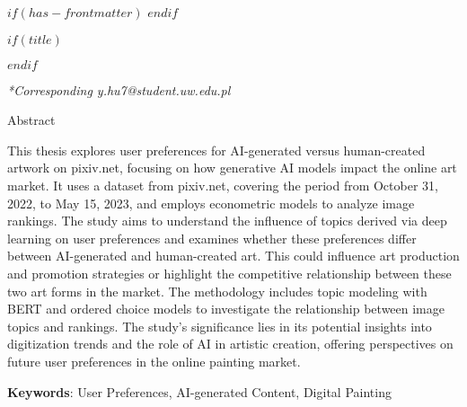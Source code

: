 $if(has-frontmatter)$
\frontmatter
$endif$

$if(title)$
\maketitle
$endif$

\vspace{-1.5 em}
\centerline{\textit{*Corresponding y.hu7@student.uw.edu.pl}}
\vspace{1 em}
\newpage

\begin{center}
\Large{Abstract}
\end{center}

This thesis explores user preferences for AI-generated versus human-created artwork on pixiv.net, focusing on how generative AI models impact the online art market. It uses a dataset from pixiv.net, covering the period from October 31, 2022, to May 15, 2023, and employs econometric models to analyze image rankings. The study aims to understand the influence of topics derived via deep learning on user preferences and examines whether these preferences differ between AI-generated and human-created art. This could influence art production and promotion strategies or highlight the competitive relationship between these two art forms in the market. The methodology includes topic modeling with BERT and ordered choice models to investigate the relationship between image topics and rankings. The study's significance lies in its potential insights into digitization trends and the role of AI in artistic creation, offering perspectives on future user preferences in the online painting market.

\textbf{Keywords}: User Preferences, AI-generated Content, Digital Painting

\vspace*{\baselineskip}
\newpage

